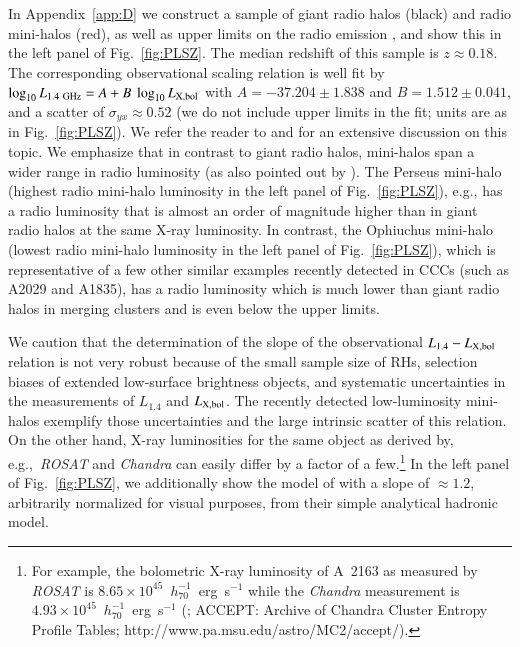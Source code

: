 \documentclass[useAMS,usenatbib]{mn2e}
\begin{document}
In Appendix~\ref{app:D} we construct a sample of giant radio halos (black) and
radio mini-halos (red), as well as upper limits on the radio emission
\citep{2009A&A...507..661B, 2011A&A...527A..99E, 2009A&A...499..371G}, and show
this in the left panel of Fig.~\ref{fig:PLSZ}. The median redshift of this
sample is $z\approx0.18$. The corresponding observational scaling relation is
well fit by $\log_{10} L_{1.4~{\mathrm{GHz}}} = A + B~\log_{10} L_{{\mathrm{X,bol}}}$ with
$A=-37.204\pm1.838$ and $B=1.512\pm0.041$, and a scatter of $\sigma_{yx} \approx
0.52$ (we do not include upper limits in the fit; units are as in
Fig.~\ref{fig:PLSZ}). We refer the reader to \cite{2009A&A...507..661B} and
\cite{2011A&A...527A..99E} for an extensive discussion on this topic. We
emphasize that in contrast to giant radio halos, mini-halos span a wider range
in radio luminosity (as also pointed out by \citealp{2009A&A...499..679M}). The
Perseus mini-halo (highest radio mini-halo luminosity in the left panel of
Fig.~\ref{fig:PLSZ}), e.g., has a radio luminosity that is almost an order of
magnitude higher than in giant radio halos at the same X-ray luminosity. In
contrast, the Ophiuchus mini-halo (lowest radio mini-halo luminosity in the left
panel of Fig.~\ref{fig:PLSZ}), which is representative of a few other similar
examples recently detected in CCCs (such as A2029 and A1835), has a radio
luminosity which is much lower than giant radio halos in merging clusters and is
even below the upper limits.

We caution that the determination of the slope of the observational
$L_{1.4}-L_{{\mathrm{X,bol}}}$ relation is not very robust because of the small
sample size of RHs, selection biases of extended low-surface brightness objects,
and systematic uncertainties in the measurements of $L_{1.4}$ and
$L_{{\mathrm{X,bol}}}$. The recently detected low-luminosity mini-halos exemplify
those uncertainties and the large intrinsic scatter of this relation. On the
other hand, X-ray luminosities for the same object as derived by,
e.g.,~\emph{ROSAT} and \emph{Chandra} can easily differ by a factor of a
few.\footnote{For example, the bolometric X-ray luminosity of A~2163 as measured
  by \emph{ROSAT} is $8.65\times10^{45}$~$h_{70}^{-1}$~erg~s$^{-1}$
  \citep{2009A&A...507..661B} while the \emph{Chandra} measurement is
  $4.93\times10^{45}$~$h_{70}^{-1}$~erg~s$^{-1}$ (\citealp{2009ApJS..182...12C};
  ACCEPT: Archive of Chandra Cluster Entropy Profile Tables;
  http://www.pa.msu.edu/astro/MC2/accept/).}  In the left panel of
Fig.~\ref{fig:PLSZ}, we additionally show the model of
\citet{2009JCAP...09..024K} with a slope of $\approx1.2$, arbitrarily normalized
for visual purposes, from their simple analytical hadronic model.
\end{document}

